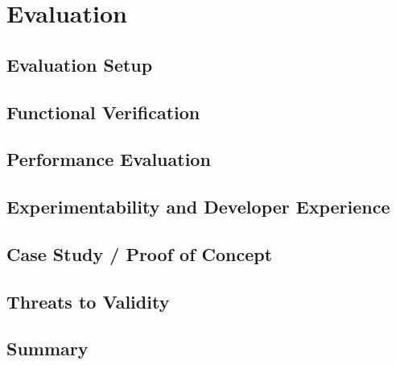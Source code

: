 \chapter{Evaluation}
\label{ch:evaluation}

\section{Evaluation Setup}

\section{Functional Verification}

\section{Performance Evaluation}

\section{Experimentability and Developer Experience}

\section{Case Study / Proof of Concept}

\section{Threats to Validity}

\section{Summary}
